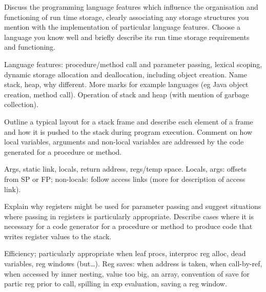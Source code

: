 \documentclass[11pt]{cityexam}
\begin{document}
\begin{questions}
\begin{subquestions}
\end{subquestions}

\question


\begin{subquestions}

\subquestion
Discuss the programming language features which influence
the organisation and functioning of run time storage,
clearly associating any storage structures you
mention with the implementation of particular language features.
Choose a language you know well and briefly describe
its run time storage requirements and functioning.

\begin{modelanswer}
Language features: procedure/method call and parameter passing,
lexical scoping, dynamic storage allocation and deallocation,
including object creation. Name stack, heap, why different.
More marks for example languages
(eg Java object creation, method call). Operation of
stack and heap (with mention of garbage collection).
\end{modelanswer}


\subquestion
Outline a typical layout for a stack frame and describe 
each element of a frame and how it is pushed to the stack during
program execution. 
Comment on how local variables, arguments and non-local variables
are addressed by the code generated for a procedure or method. 

\begin{modelanswer}
Args, static link, locals, return address, regs/temp space.
Locals, args: offsets from SP or FP; non-locals: follow access links
(more for description of access link).
\end{modelanswer}

\subquestion
Explain why registers might be used for parameter passing and
suggest situations where passing in registers is particularly
appropriate. 
Describe cases where it is necessary for a code generator
for a procedure or method to produce code that writes 
register values to the stack. 

\begin{modelanswer}
Efficiency; particularly appropriate when leaf procs, interproc
reg alloc, dead variables, reg windows (but\ldots).
Reg saves: when address is taken,
when call-by-ref,
when accessed by inner nesting,
value too big,
an array,
convention of save for partic reg prior to call,
spilling in exp evaluation,
saving a reg window.
\end{modelanswer}

\end{subquestions}


\end{questions}
\end{document}
